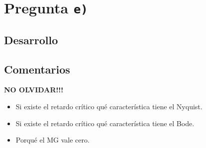 \section{Pregunta \texttt{e)}}\label{pregunta-e}


\subsection{Desarrollo}


\FloatBarrier
\subsection{Comentarios}

\textbf{NO OLVIDAR!!!}


\begin{itemize}
  \item Si existe el retardo crítico qué característica tiene el Nyquist.
  \item Si existe el retardo crítico qué característica tiene el Bode.
  \item Porqué el MG vale cero.
\end{itemize}

